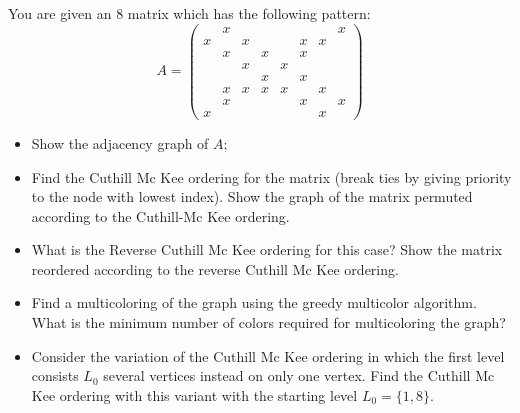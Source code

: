 \documentclass{ctexart}
\begin{document}
 \begin{problem} 
   You are given an \(8 \) matrix which has the following pattern: 
     \[
A =
\begin{pmatrix}
  & x &   &   &   &   &   & x \\
x &   & x &   &   & x & x &   \\
  & x &   & x &   & x &   &   \\
  &   & x &   & x &   &   &   \\
  &   &   & x &   & x &   &   \\
  & x & x & x & x &   & x &   \\
  & x &   &   &   & x &   & x \\
x &   &   &   &   &   & x &  
\end{pmatrix}
\]

   \begin{itemize}
     \item Show the adjacency graph of \(A \);
     \item Find the Cuthill Mc Kee ordering for the matrix (break ties by 
       giving priority to the node with lowest index). Show the graph of 
       the matrix permuted according to the Cuthill-Mc Kee ordering.
     \item What is the Reverse Cuthill Mc Kee ordering for this case? Show the matrix 
       reordered according to the reverse Cuthill Mc Kee ordering.
     \item Find a multicoloring of the graph using the greedy multicolor 
       algorithm. What is the minimum number of colors required for multicoloring 
       the graph? 
     \item Consider the variation of the Cuthill Mc Kee ordering in which the 
       first level consists \(L_0 \) several vertices instead on only one vertex. 
       Find the Cuthill Mc Kee ordering with this variant with the starting level 
       \(L_0 = \{1,8\} \).
   \end{itemize}
 \end{problem}
\end{document}

